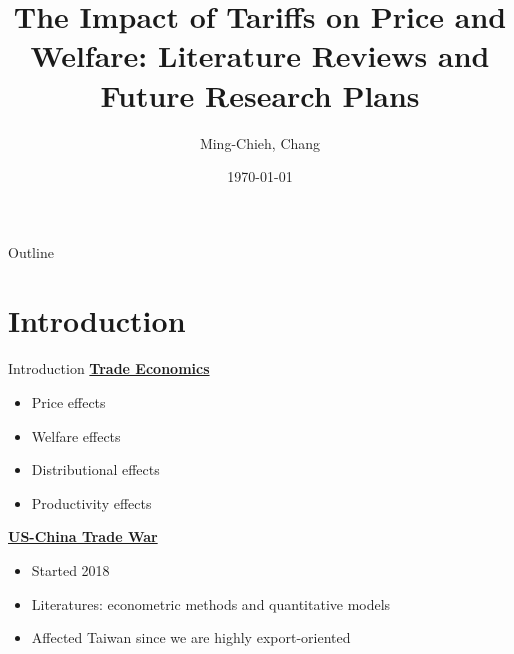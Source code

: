 \documentclass{beamer}
\title[]{The Impact of Tariffs on Price and Welfare: Literature Reviews and Future Research Plans}
\author[]{Ming-Chieh, Chang}
\institute{National Taiwan University}
\date{\today}
\begin{document}
\begin{frame}
    \titlepage 
\end{frame}

\begin{frame}{Outline}
    \tableofcontents
\end{frame}

\section{Introduction}
\begin{frame}{Introduction}
    \underline{\textbf{Trade Economics}}
    \begin{itemize}
        \item Price effects
        \item Welfare effects
        \item Distributional effects
        \item Productivity effects
    \end{itemize}

    \vspace{3mm}

    \underline{\textbf{US-China Trade War}}
    \begin{itemize}
        \item Started 2018
        \item Literatures: econometric methods and quantitative models
        \item Affected {\color{red}Taiwan} since we are highly {\color{red}export-oriented}
    \end{itemize}
\end{frame}
\end{document}
